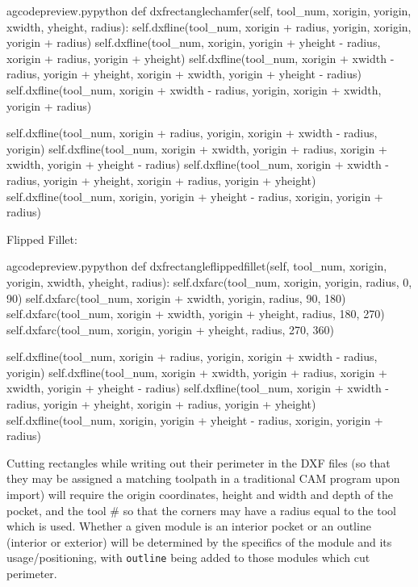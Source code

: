 \documentclass{ltxdoc}
\begin{document}
\lstset{firstnumber=\thegcpy}
\begin{writecode}{a}{gcodepreview.py}{python}
    def dxfrectanglechamfer(self, tool_num, xorigin, yorigin, xwidth, yheight, radius):
        self.dxfline(tool_num, xorigin + radius, yorigin, xorigin, yorigin + radius)
        self.dxfline(tool_num, xorigin, yorigin + yheight - radius, xorigin + radius, yorigin + yheight)
        self.dxfline(tool_num, xorigin + xwidth - radius, yorigin + yheight, xorigin + xwidth, yorigin + yheight - radius)
        self.dxfline(tool_num, xorigin + xwidth - radius, yorigin, xorigin + xwidth, yorigin + radius)

        self.dxfline(tool_num, xorigin + radius, yorigin, xorigin + xwidth - radius, yorigin)
        self.dxfline(tool_num, xorigin + xwidth, yorigin + radius, xorigin + xwidth, yorigin + yheight - radius)
        self.dxfline(tool_num, xorigin + xwidth - radius, yorigin + yheight, xorigin + radius, yorigin + yheight)
        self.dxfline(tool_num, xorigin, yorigin + yheight - radius, xorigin, yorigin + radius)

\end{writecode}
\addtocounter{gcpy}{11}

Flipped Fillet:

\lstset{firstnumber=\thegcpy}
\begin{writecode}{a}{gcodepreview.py}{python}
    def dxfrectangleflippedfillet(self, tool_num, xorigin, yorigin, xwidth, yheight, radius):
        self.dxfarc(tool_num, xorigin, yorigin, radius,  0, 90)
        self.dxfarc(tool_num, xorigin + xwidth, yorigin, radius, 90, 180)
        self.dxfarc(tool_num, xorigin + xwidth, yorigin + yheight, radius, 180, 270)
        self.dxfarc(tool_num, xorigin, yorigin + yheight, radius, 270, 360)

        self.dxfline(tool_num, xorigin + radius, yorigin, xorigin + xwidth - radius, yorigin)
        self.dxfline(tool_num, xorigin + xwidth, yorigin + radius, xorigin + xwidth, yorigin + yheight - radius)
        self.dxfline(tool_num, xorigin + xwidth - radius, yorigin + yheight, xorigin + radius, yorigin + yheight)
        self.dxfline(tool_num, xorigin, yorigin + yheight - radius, xorigin, yorigin + radius)

\end{writecode}
\addtocounter{gcpy}{11}

Cutting rectangles while writing out their perimeter in the DXF files (so that they may be assigned a matching toolpath in a traditional CAM program upon import) will require the origin coordinates, height and width and depth of the pocket, and the tool \# so that the corners may have a radius equal to the tool which is used. Whether a given module is an interior pocket or an outline (interior or exterior) will be determined by the specifics of the module and its usage/positioning, with \texttt{outline} being added to those modules which cut perimeter.
\end{document}
